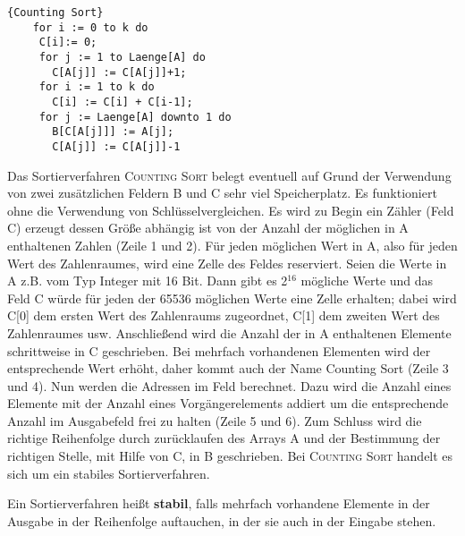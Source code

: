   \begin{Algorithmus}[H]
    \begin{lstlisting}[frame=tlrb, mathescape=true, title=\textsc{Counting Sort}, gobble=4]{Counting Sort}
    for i := 0 to k do
     C[i]:= 0;
     for j := 1 to Laenge[A] do
       C[A[j]] := C[A[j]]+1;
     for i := 1 to k do
       C[i] := C[i] + C[i-1];
     for j := Laenge[A] downto 1 do
       B[C[A[j]]] := A[j];
       C[A[j]] := C[A[j]]-1
    \end{lstlisting}

  Das Sortierverfahren \textsc{Counting Sort}  belegt eventuell auf Grund der Verwendung von zwei zusätzlichen Feldern 
  B und C sehr viel Speicherplatz.
  Es funktioniert ohne die Verwendung von Schlüsselvergleichen. Es wird zu Begin ein Zähler (Feld C) erzeugt 
  dessen Größe abhängig ist von der Anzahl der möglichen in A 
  enthaltenen Zahlen (Zeile 1 und 2). Für jeden möglichen Wert in A, also für jeden Wert des Zahlenraumes, wird eine Zelle des Feldes
  reserviert. Seien die Werte in A z.B. vom Typ Integer mit 16 Bit. Dann gibt es 2$^{16}$ mögliche Werte und das Feld C würde für
  jeden der 65536 möglichen Werte eine Zelle erhalten; dabei wird C[0] dem ersten Wert des Zahlenraums zugeordnet, C[1] dem zweiten
  Wert des Zahlenraumes usw.
  Anschließend wird die Anzahl der in 
  A enthaltenen Elemente schrittweise in C geschrieben. Bei mehrfach 
  vorhandenen Elementen wird der entsprechende Wert erhöht, daher kommt auch 
  der Name Counting Sort (Zeile 3 und 4). Nun werden die Adressen im Feld
  berechnet. Dazu wird die Anzahl eines Elemente mit der Anzahl eines 
  Vorgängerelements addiert um die entsprechende Anzahl im Ausgabefeld frei 
  zu halten (Zeile 5 und 6). Zum Schluss wird die richtige Reihenfolge durch 
  zurücklaufen des Arrays A und der Bestimmung der richtigen Stelle, mit Hilfe 
  von C, in B geschrieben. Bei \textsc{Counting Sort} handelt es sich um ein stabiles Sortierverfahren.
  \end{Algorithmus}
  
  \begin{definition}
  Ein Sortierverfahren heißt \textbf{stabil}, falls mehrfach vorhandene Elemente in der Ausgabe in der Reihenfolge auftauchen, in der sie auch
  in der Eingabe stehen.
  \end{definition}
  
